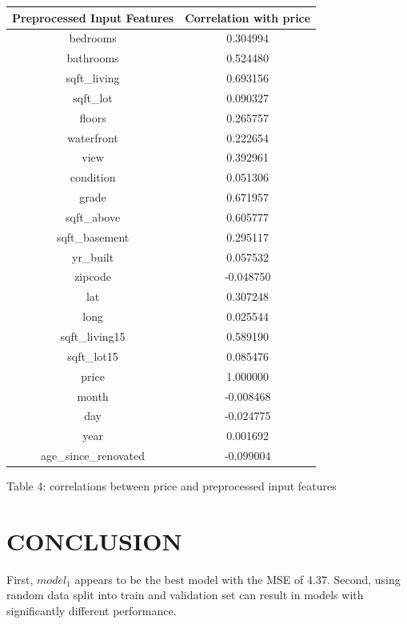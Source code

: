 \documentclass[12pt,article]{article}
\begin{document}
\begin{center}
    \begin{tabular}{ |c|c|} 
        \hline
        Preprocessed Input Features & Correlation with price \\
        \hline
        bedrooms             &  0.304994 \\
        bathrooms            &  0.524480 \\
        sqft\_living          &  0.693156 \\
        sqft\_lot             &  0.090327 \\
        floors               &  0.265757 \\
        waterfront           &  0.222654 \\
        view                 &  0.392961 \\
        condition            &  0.051306 \\
        grade                &  0.671957 \\
        sqft\_above           &  0.605777 \\
        sqft\_basement        &  0.295117 \\
        yr\_built             &  0.057532 \\
        zipcode              & -0.048750 \\
        lat                  &  0.307248 \\
        long                 &  0.025544 \\
        sqft\_living15        &  0.589190 \\
        sqft\_lot15           &  0.085476 \\
        price                &  1.000000 \\
        month                & -0.008468 \\
        day                  & -0.024775 \\
        year                 &  0.001692 \\
        age\_since\_renovated  & -0.099004 \\
        \hline
    \end{tabular}
    
    Table 4: correlations between price and preprocessed input features
\end{center}


\section*{CONCLUSION}
First, $model_1$ appears to be the best model with the MSE of 4.37. Second, 
using random data split into train and validation set can result in models with 
significantly different performance. 
\end{document}
